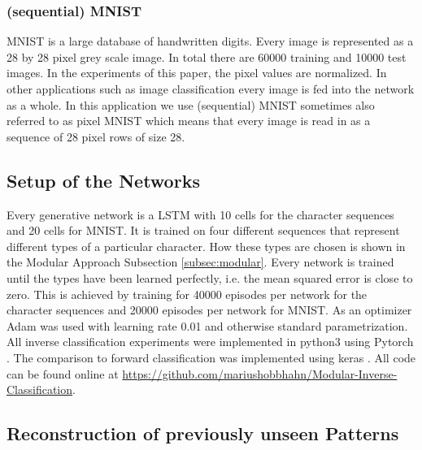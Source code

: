 \documentclass{article}
\begin{document}
\subsubsection{(sequential) MNIST}

MNIST is a large database of handwritten digits. Every image is represented as a 28 by 28 pixel grey scale image. In total there are 60000 training and 10000 test images. In the experiments of this paper, the pixel values are normalized. In other applications such as image classification every image is fed into the network as a whole. In this application we use (sequential) MNIST sometimes also referred to as pixel MNIST which means that every image is read in as a sequence of 28 pixel rows of size 28. 


\subsection{Setup of the Networks}
\label{subsec:setup}

Every generative network is a LSTM with 10 cells for the character sequences and 20 cells for MNIST. It is trained on four different sequences that represent different types of a particular character. How these types are chosen is shown in the Modular Approach Subsection \ref{subsec:modular}. Every network is trained until the types have been learned perfectly, i.e. the mean squared error is close to zero. This is achieved by training for 40000 episodes per network for the character sequences and 20000 episodes per network for MNIST. As an optimizer Adam \cite{AdamKingmaB14} was used with learning rate 0.01 and otherwise standard parametrization. All inverse classification experiments were implemented in python3 using Pytorch \cite{Pytorch}. The comparison to forward classification was implemented using keras \cite{chollet2015keras}. All code can be found online at 
\url{https://github.com/mariushobbhahn/Modular-Inverse-Classification}.

\subsection{Reconstruction of previously unseen Patterns}
\label{subsec:reconstruction}
\end{document}
